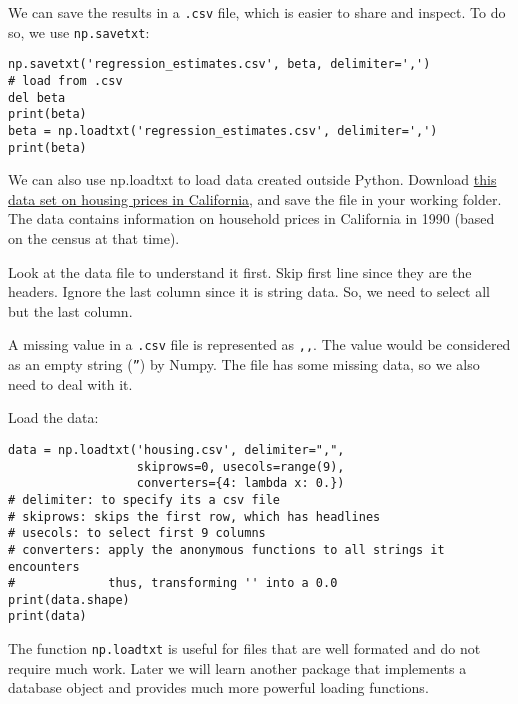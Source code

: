 \documentclass[12pt, a4paper]{article}
\begin{document}
We can save the results in a \texttt{.csv} file, which is easier to share and inspect.
To do so, we use \texttt{np.savetxt}:
\lstset{language=jupyter-python,label= ,caption= ,captionpos=b,numbers=none}
\begin{lstlisting}
np.savetxt('regression_estimates.csv', beta, delimiter=',')
# load from .csv
del beta
print(beta)
beta = np.loadtxt('regression_estimates.csv', delimiter=',')
print(beta)
\end{lstlisting}

We can also use np.loadtxt to load data created outside Python.
Download \href{https://raw.githubusercontent.com/Salompas/handson-ml/master/datasets/housing/housing.csv}{this data set on housing prices in California}, and save the file in your working folder.
The data contains information on household prices in California in 1990 (based on the census at that time).

Look at the data file to understand it first.
Skip first line since they are the headers.
Ignore the last column since it is string data.
So, we need to select all but the last column.

A missing value in a \texttt{.csv} file is represented as \texttt{,,}.
The value would be considered as an empty string (\texttt{''}) by Numpy.
The file has some missing data, so we also need to deal with it.

Load the data:
\lstset{language=jupyter-python,label= ,caption= ,captionpos=b,numbers=none}
\begin{lstlisting}
data = np.loadtxt('housing.csv', delimiter=",",
                  skiprows=0, usecols=range(9),
                  converters={4: lambda x: 0.})
# delimiter: to specify its a csv file
# skiprows: skips the first row, which has headlines
# usecols: to select first 9 columns
# converters: apply the anonymous functions to all strings it encounters
#             thus, transforming '' into a 0.0
print(data.shape)
print(data)
\end{lstlisting}
The function \texttt{np.loadtxt} is useful for files that are well formated and do not require much work.
Later we will learn another package that implements a database object and provides much more powerful loading functions.
\end{document}
